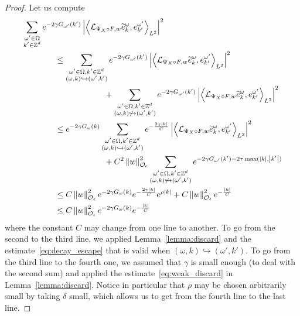 \documentclass[AHL,Unicode,longabstracts,published]{cedram}
\newcommand{\n}[1]{\left\|#1\right\|}
\newcommand{\va}[1]{\left|#1\right|}
\newcommand{\clO}{\mathcal{O}}
\newcommand{\clL}{\mathcal{L}}
\newcommand{\bbZ}{\mathbb{Z}}
\let\oldtilde\tilde
\renewcommand*{\tilde}[1]{\mathchoice{\widetilde{#1}}{\widetilde{#1}}{\oldtilde{#1}}{\oldtilde{#1}}}
\newcommand{\clO}{\mathcal{O}}
\begin{document}
\begin{proof}
Let us compute
\begingroup
\allowdisplaybreaks
\begin{align*}
& \sum_{\substack{\omega' \in \Omega \\ k' \in \bbZ^d}} e^{-2 \gamma G_{\omega'}(k')} \va{\left\langle \clL_{\Psi_X \circ F,w} \tilde{e}_{k}^{\omega}, e_{k'}^{\omega'}\right\rangle_{L^2}}^2 \\ & \qquad \qquad \leq \sum_{\substack{\omega' \in \Omega, k' \in \bbZ^d \\ (\omega,k) \hookrightarrow (\omega',k')}} e^{-2 \gamma G_{\omega'}(k')} \va{\left\langle \clL_{\Psi_X \circ F,w} \tilde{e}_{k}^{\omega}, e_{k'}^{\omega'}\right\rangle_{L^2}}^2 \\
& \qquad \qquad \qquad \qquad \qquad + \sum_{\substack{\omega' \in \Omega, k' \in \bbZ^d \\ (\omega,k) \not\hookrightarrow (\omega',k')}} e^{-2 \gamma G_{\omega'}(k')} \va{\left\langle \clL_{\Psi_X \circ F,w} \tilde{e}_{k}^{\omega}, e_{k'}^{\omega'}\right\rangle_{L^2}}^2 \\
& \qquad \qquad \leq e^{-2 \gamma G_\omega(k)} \sum_{\substack{\omega' \in \Omega, k' \in \bbZ^d \\ (\omega,k) \hookrightarrow (\omega',k')}} e^{- \frac{2 \gamma \va{k}}{C}} \va{\left\langle \clL_{\Psi_X \circ F,w} \tilde{e}_{k}^{\omega}, e_{k'}^{\omega'}\right\rangle_{L^2}}^2 \\
& \qquad \qquad \qquad \qquad \qquad + C^2 \n{w}_{\clO_\epsilon}^2 \sum_{\substack{\omega' \in \Omega, k' \in \bbZ^d \\ (\omega,k) \not\hookrightarrow (\omega',k')}} e^{-2 \gamma G_{\omega'}(k') - 2 \tau \max(\va{k},\va{k'}) } \\
& \qquad \qquad \leq C \n{w}_{\clO_\epsilon}^2 e^{-2 \gamma G_\omega(k)}e^{- \frac{2 \gamma \va{k}}{C}} e^{\rho \va{k}} + C \n{w}_{\clO_\epsilon}^2 e^{- \frac{\va{k}}{C}} \\
& \qquad \qquad \leq C \n{w}_{\clO_\epsilon}^2 e^{-2 \gamma G_\omega(k)} e^{ - \frac{\va{k}}{C}}
\end{align*}
\endgroup
\noindent where the constant $C$ may change from one line to another. To go from the second to the third line, we applied Lemma~\ref{lemma:discard} and the estimate~\eqref{eq:decay_escape} that is valid when $(\omega,k) \hookrightarrow (\omega',k')$. To go from the third line to the fourth one, we assumed that $\gamma$ is small enough (to deal with the second sum) and applied the estimate~\eqref{eq:weak_discard} in Lemma~\ref{lemma:discard}. Notice in particular that $\rho$ may be chosen arbitrarily small by taking $\delta$ small, which allows us to get from the fourth line to the last line.


\end{proof}
\end{document}

